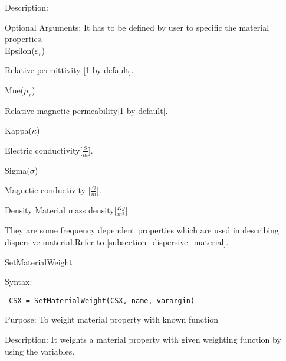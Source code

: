  \begin{FontDescr}{Description:} 
 \begin{FontDescr}{Optional Arguments:}
  It has to be defined by user to specific the material properties.\\ 

   \textcolor{varcol}{Epsilon($\varepsilon_{r}$)}\begin{myindentpar}
     Relative permittivity [1 by default].\end{myindentpar} 

 \textcolor{varcol}{Mue($\mu_{r}$)} \begin{myindentpar}
Relative magnetic permeability[1 by default].\end{myindentpar}   

  \textcolor{varcol}{Kappa($\kappa$)} \begin{myindentpar} Electric conductivity[$\frac{S}{m}$].
\end{myindentpar} 

  \textcolor{varcol}{Sigma($\sigma$)} \begin{myindentpar}Magnetic conductivity [$\frac{\Omega}{m}$].\end{myindentpar} 

  \begin{FontPara}{Density} Material mass density[$\frac{Kg}{m^{3}}$] \end{FontPara}

   They are some frequency dependent properties which are used in describing dispersive material.Refer to \ref{subsection_dispersive_material}. 
  
 \end{FontDescr}
 \end{FontDescr}


\begin{FontNameFunct}{SetMaterialWeight}
\end{FontNameFunct}

\begin{FontDescr}{Syntax:}
  \begin{lstlisting}
 CSX = SetMaterialWeight(CSX, name, varargin)
  \end{lstlisting}
\end{FontDescr}  

\begin{FontDescr}{Purpose:}
To weight material property with known function
\end{FontDescr}

\begin{FontDescr}{Description:}
It weights a material property with given weighting function by using the variables.
\end{FontDescr}

